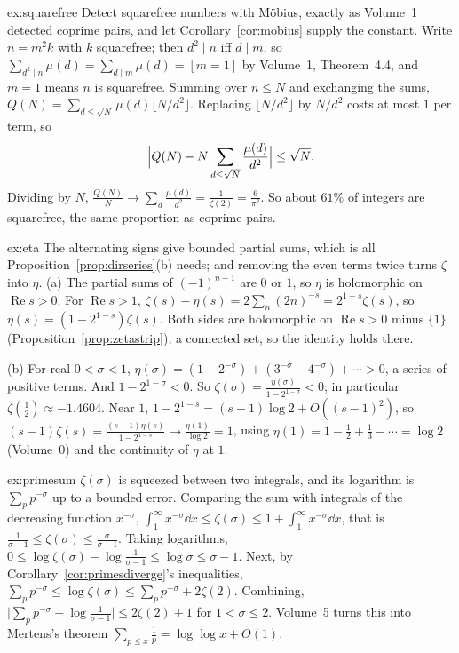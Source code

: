 \begin{solution}{ex:squarefree}
\idea Detect squarefree numbers with M\"obius, exactly as Volume~1 detected coprime pairs, and let Corollary~\ref{cor:mobius} supply the constant.
\writeup Write $n=m^2k$ with $k$ squarefree; then $d^2\mid n$ iff $d\mid m$, so $\sum_{d^2\mid n}\mu(d)=\sum_{d\mid m}\mu(d)=[m=1]$ by Volume~1, Theorem~4.4, and $m=1$ means $n$ is squarefree.
Summing over $n\le N$ and exchanging the sums, $Q(N)=\sum_{d\le\sqrt N}\mu(d)\lfloor N/d^2\rfloor$. Replacing $\lfloor N/d^2\rfloor$ by $N/d^2$ costs at most $1$ per term, so
\[
\Bigl|Q(N)-N\sum_{d\le\sqrt N}\frac{\mu(d)}{d^2}\Bigr|\le\sqrt N.
\]
Dividing by $N$, $\frac{Q(N)}N\to\sum_d\frac{\mu(d)}{d^2}=\frac1{\zeta(2)}=\frac6{\pi^2}$. So about $61\%$ of integers are squarefree, the same proportion as coprime pairs.
\end{solution}

\begin{solution}{ex:eta}
\idea The alternating signs give bounded partial sums, which is all Proposition~\ref{prop:dirseries}(b) needs; and removing the even terms twice turns
$\zeta$ into $\eta$.
\writeup (a) The partial sums of $(-1)^{n-1}$ are $0$ or $1$, so $\eta$ is holomorphic on $\operatorname{Re}s>0$. For $\operatorname{Re}s>1$, $\zeta(s)-\eta(s)=2\sum_n(2n)^{-s}=2^{1-s}\zeta(s)$, so
$\eta(s)=(1-2^{1-s})\zeta(s)$. Both sides are holomorphic on $\operatorname{Re}s>0$ minus $\{1\}$ (Proposition~\ref{prop:zetastrip}), a connected set, so the identity holds there.

(b) For real $0<\sigma<1$, $\eta(\sigma)=(1-2^{-\sigma})+(3^{-\sigma}-4^{-\sigma})+\cdots>0$, a series of positive terms. And $1-2^{1-\sigma}<0$. So $\zeta(\sigma)=\frac{\eta(\sigma)}{1-2^{1-\sigma}}<0$; in
particular $\zeta(\frac12)\approx-1.4604$. Near $1$, $1-2^{1-s}=(s-1)\log2+O((s-1)^2)$, so $(s-1)\zeta(s)=\frac{(s-1)\eta(s)}{1-2^{1-s}}\to\frac{\eta(1)}{\log2}=1$, using
$\eta(1)=1-\frac12+\frac13-\cdots=\log2$ (Volume~0) and the continuity of $\eta$ at $1$.
\end{solution}

\begin{solution}{ex:primesum}
\idea $\zeta(\sigma)$ is squeezed between two integrals, and its logarithm is $\sum_pp^{-\sigma}$ up to a bounded error.
\writeup Comparing the sum with integrals of the decreasing function $x^{-\sigma}$, $\int_1^\infty x^{-\sigma}\dd x\le\zeta(\sigma)\le1+\int_1^\infty x^{-\sigma}\dd x$, that is
$\frac1{\sigma-1}\le\zeta(\sigma)\le\frac\sigma{\sigma-1}$. Taking logarithms, $0\le\log\zeta(\sigma)-\log\frac1{\sigma-1}\le\log\sigma\le\sigma-1$. Next, by Corollary~\ref{cor:primesdiverge}'s inequalities,
$\sum_pp^{-\sigma}\le\log\zeta(\sigma)\le\sum_pp^{-\sigma}+2\zeta(2)$. Combining, $\bigl|\sum_pp^{-\sigma}-\log\frac1{\sigma-1}\bigr|\le2\zeta(2)+1$ for $1<\sigma\le2$. Volume~5 turns this into Mertens's
theorem $\sum_{p\le x}\frac1p=\log\log x+O(1)$.
\end{solution}

